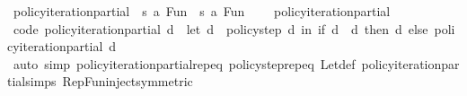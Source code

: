 \begin{isabellebody}
\endisatagproof
{\isafoldproof}%
%
\isadelimproof
\isanewline
%
\endisadelimproof
\isanewline
{}\isamarkupfalse%
\ policy{\isacharunderscore}{\kern0pt}iteration{\isacharunderscore}{\kern0pt}partial{\isacharprime}{\kern0pt}\ {\isacharcolon}{\kern0pt}{\isacharcolon}{\kern0pt}\ {\isachardoublequoteopen}{\isacharparenleft}{\kern0pt}{\isacharprime}{\kern0pt}s{\isacharcomma}{\kern0pt}\ {\isacharprime}{\kern0pt}a{\isacharparenright}{\kern0pt}\ Fun\ {\isasymRightarrow}\ {\isacharparenleft}{\kern0pt}{\isacharprime}{\kern0pt}s{\isacharcomma}{\kern0pt}\ {\isacharprime}{\kern0pt}a{\isacharparenright}{\kern0pt}\ Fun{\isachardoublequoteclose}\ \isanewline
\ \ \ policy{\isacharunderscore}{\kern0pt}iteration{\isacharunderscore}{\kern0pt}partial%
\isadelimproof
%
\endisadelimproof
%
\isatagproof
\isacommand{{\isachardot}{\kern0pt}}\isamarkupfalse%
%
\endisatagproof
{\isafoldproof}%
%
\isadelimproof
%
\endisadelimproof
\isanewline
\isanewline
{}\isamarkupfalse%
\ {\isacharbrackleft}{\kern0pt}code{\isacharbrackright}{\kern0pt}{\isacharcolon}{\kern0pt}\ {\isachardoublequoteopen}policy{\isacharunderscore}{\kern0pt}iteration{\isacharunderscore}{\kern0pt}partial{\isacharprime}{\kern0pt}\ d\ {\isacharequal}{\kern0pt}\ {\isacharparenleft}{\kern0pt}let\ d{\isacharprime}{\kern0pt}\ {\isacharequal}{\kern0pt}\ policy{\isacharunderscore}{\kern0pt}step{\isacharprime}{\kern0pt}\ d\ in\ if\ d\ {\isacharequal}{\kern0pt}\ d{\isacharprime}{\kern0pt}\ then\ d\ else\ policy{\isacharunderscore}{\kern0pt}iteration{\isacharunderscore}{\kern0pt}partial{\isacharprime}{\kern0pt}\ d{\isacharprime}{\kern0pt}{\isacharparenright}{\kern0pt}{\isachardoublequoteclose}\isanewline
%
\isadelimproof
\ \ %
\endisadelimproof
%
\isatagproof
{}\isamarkupfalse%
\ {\isacharparenleft}{\kern0pt}auto\ simp{\isacharcolon}{\kern0pt}\ policy{\isacharunderscore}{\kern0pt}iteration{\isacharunderscore}{\kern0pt}partial{\isacharprime}{\kern0pt}{\isachardot}{\kern0pt}rep{\isacharunderscore}{\kern0pt}eq\ policy{\isacharunderscore}{\kern0pt}step{\isacharprime}{\kern0pt}{\isachardot}{\kern0pt}rep{\isacharunderscore}{\kern0pt}eq\ Let{\isacharunderscore}{\kern0pt}def\ policy{\isacharunderscore}{\kern0pt}iteration{\isacharunderscore}{\kern0pt}partial{\isachardot}{\kern0pt}simps\ Rep{\isacharunderscore}{\kern0pt}Fun{\isacharunderscore}{\kern0pt}inject{\isacharbrackleft}{\kern0pt}symmetric{\isacharbrackright}{\kern0pt}{\isacharparenright}{\kern0pt}%
\endisatagproof
{\isafoldproof}%
%
\isadelimproof
\isanewline
%
\endisadelimproof
\isanewline

\end{isabellebody}
